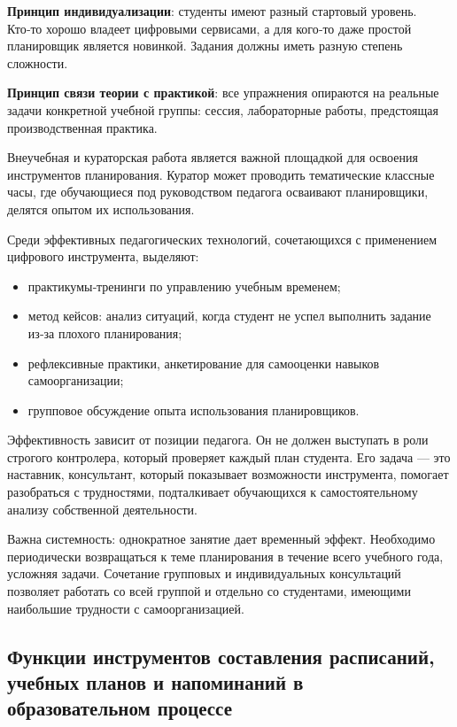 \documentclass[14pt,a4paper]{article}
\begin{document}
\textbf{Принцип индивидуализации}: студенты имеют разный стартовый уровень. Кто‑то хорошо владеет цифровыми сервисами, а для кого‑то даже простой планировщик является новинкой. Задания должны иметь разную степень сложности.

\textbf{Принцип связи теории с практикой}: все упражнения опираются на реальные задачи конкретной учебной группы: сессия, лабораторные работы, предстоящая производственная практика.

Внеучебная и кураторская работа является важной площадкой для освоения инструментов планирования. Куратор может проводить тематические классные часы, где обучающиеся под руководством педагога осваивают планировщики, делятся опытом их использования.

Среди эффективных педагогических технологий, сочетающихся с применением цифрового инструмента, выделяют:
\begin{itemize}
    \item практикумы‑тренинги по управлению учебным временем;
    \item метод кейсов: анализ ситуаций, когда студент не успел выполнить задание из‑за плохого планирования;
    \item рефлексивные практики, анкетирование для самооценки навыков самоорганизации;
    \item групповое обсуждение опыта использования планировщиков.
\end{itemize}

Эффективность зависит от позиции педагога. Он не должен выступать в роли строгого контролера, который проверяет каждый план студента. Его задача — это наставник, консультант, который показывает возможности инструмента, помогает разобраться с трудностями, подталкивает обучающихся к самостоятельному анализу собственной деятельности.

Важна системность: однократное занятие дает временный эффект. Необходимо периодически возвращаться к теме планирования в течение всего учебного года, усложняя задачи. Сочетание групповых и индивидуальных консультаций позволяет работать со всей группой и отдельно со студентами, имеющими наибольшие трудности с самоорганизацией.


\subsection{Функции инструментов составления расписаний, учебных планов и напоминаний в образовательном процессе}
\end{document}
